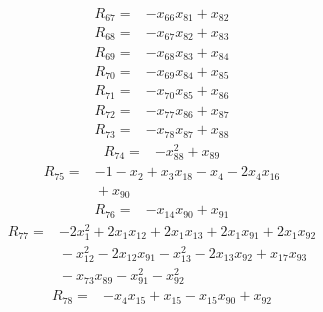 {\begin{align*}
\end{align*}
\begin{align*}
R_{67} ={}& -x_{66} x_{81} + x_{82}
\end{align*}
\begin{align*}
R_{68} ={}& -x_{67} x_{82} + x_{83}
\end{align*}
\begin{align*}
R_{69} ={}& -x_{68} x_{83} + x_{84}
\end{align*}
\begin{align*}
R_{70} ={}& -x_{69} x_{84} + x_{85}
\end{align*}
\begin{align*}
R_{71} ={}& -x_{70} x_{85} + x_{86}
\end{align*}
\begin{align*}
R_{72} ={}& -x_{77} x_{86} + x_{87}
\end{align*}
\begin{align*}
R_{73} ={}& -x_{78} x_{87} + x_{88}
\end{align*}
\begin{align*}
R_{74} ={}& -x_{88}^{2} + x_{89}
\end{align*}
\begin{align*}
R_{75} ={}& -1 - x_{2} + x_{3} x_{18} - x_{4} - 2x_{4} x_{16} \\
&{}  + x_{90}
\end{align*}
\begin{align*}
R_{76} ={}& -x_{14} x_{90} + x_{91}
\end{align*}
\begin{align*}
R_{77} ={}& -2x_{1}^{2} + 2x_{1} x_{12} + 2x_{1} x_{13} + 2x_{1} x_{91} + 2x_{1} x_{92} \\
&{}  - x_{12}^{2} - 2x_{12} x_{91} - x_{13}^{2} - 2x_{13} x_{92} + x_{17} x_{93} \\
&{}  - x_{73} x_{89} - x_{91}^{2} - x_{92}^{2}
\end{align*}
\begin{align*}
R_{78} ={}& -x_{4} x_{15} + x_{15} - x_{15} x_{90} + x_{92}
\end{align*}
}
